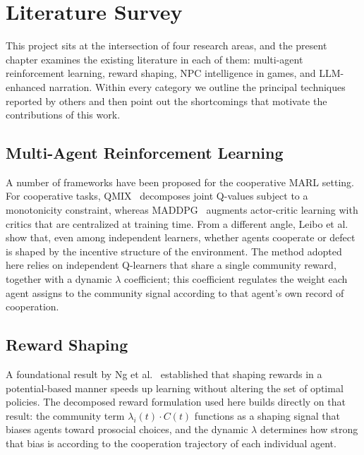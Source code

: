 \documentclass[12pt, a4paper, oneside]{report}
\begin{document}
\chapter{Literature Survey}
\label{chap:literature}

This project sits at the intersection of four research areas, and the present chapter examines the existing literature in each of them: multi-agent reinforcement learning, reward shaping, NPC intelligence in games, and LLM-enhanced narration. Within every category we outline the principal techniques reported by others and then point out the shortcomings that motivate the contributions of this work.

\section{Multi-Agent Reinforcement Learning}
\label{sec:marl}

A number of frameworks have been proposed for the cooperative MARL setting. For cooperative tasks, QMIX~\cite{rashid2018qmix} decomposes joint Q-values subject to a monotonicity constraint, whereas MADDPG~\cite{lowe2017maddpg} augments actor-critic learning with critics that are centralized at training time. From a different angle, Leibo et al.~\cite{leibo2017multi} show that, even among independent learners, whether agents cooperate or defect is shaped by the incentive structure of the environment. The method adopted here relies on independent Q-learners that share a single community reward, together with a dynamic $\lambda$ coefficient; this coefficient regulates the weight each agent assigns to the community signal according to that agent's own record of cooperation.

\section{Reward Shaping}
\label{sec:reward-shaping}

A foundational result by Ng et al.~\cite{ng1999rewardshaping} established that shaping rewards in a potential-based manner speeds up learning without altering the set of optimal policies. The decomposed reward formulation used here builds directly on that result: the community term $\lambda_i(t) \cdot C(t)$ functions as a shaping signal that biases agents toward prosocial choices, and the dynamic $\lambda$ determines how strong that bias is according to the cooperation trajectory of each individual agent.
\end{document}
